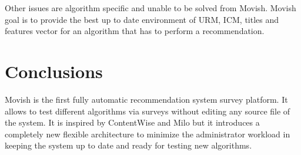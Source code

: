 Other issues are algorithm specific and unable to be solved from Movish. Movish goal is to provide the best up to date environment of \ac{URM}, \ac{ICM}, titles and features vector for an algorithm that has to perform a recommendation. 

\section{Conclusions}
\label{sec:movish_conclusions}

Movish is the first fully automatic recommendation system survey platform. It allows to test different algorithms via surveys without editing any source file of the system. It is inspired by ContentWise and Milo but it introduces a completely new flexible architecture to minimize the administrator workload in keeping the system up to date and ready for testing new algorithms.  

\acresetall